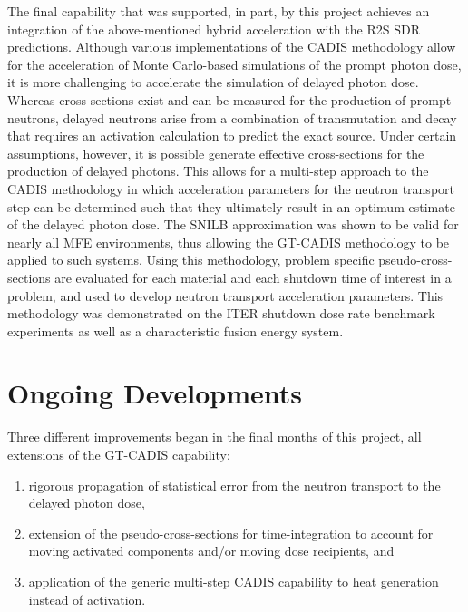 The final capability that was supported, in part, by this project achieves an
integration of the above-mentioned hybrid acceleration with the \gls{R2S}
\gls{SDR} predictions.  Although various implementations of the \gls{CADIS}
methodology allow for the acceleration of Monte Carlo-based simulations of the
prompt photon dose, it is more challenging to accelerate the simulation of
delayed photon dose.  Whereas cross-sections exist and can be measured for
the production of prompt neutrons, delayed neutrons arise from a combination
of transmutation and decay that requires an activation calculation to predict
the exact source.  Under certain assumptions, however, it is possible generate
effective cross-sections for the production of delayed photons.  This allows
for a multi-step approach to the \gls{CADIS} methodology in which acceleration
parameters for the neutron transport step can be determined such that they
ultimately result in an optimum estimate of the delayed photon dose.  The
\gls{SNILB} approximation was shown to be valid for nearly all \gls{MFE}
environments, thus allowing the \gls{GT-CADIS} methodology to be applied to
such systems.  Using this methodology, problem specific pseudo-cross-sections
are evaluated for each material and each shutdown time of interest in a
problem, and used to develop neutron transport acceleration parameters.  This
methodology was demonstrated on the ITER shutdown dose rate benchmark
experiments as well as a characteristic fusion energy
system.

\section{Ongoing Developments}

Three different improvements began in the final months of this project, all
extensions of the \gls{GT-CADIS} capability:
\begin{enumerate}
\item rigorous propagation of statistical error from the neutron transport to
  the delayed photon dose,
\item extension of the pseudo-cross-sections for time-integration to account
  for moving activated components and/or moving dose recipients, and
\item application of the generic multi-step \gls{CADIS} capability to heat
  generation instead of activation.
\end{enumerate} 
